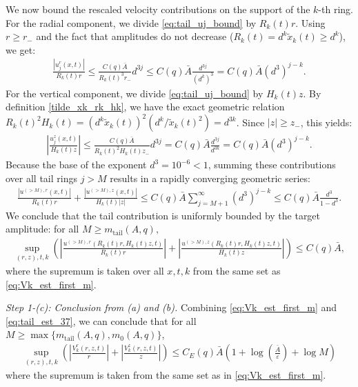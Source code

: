 \documentclass[reqno,11pt]{amsart}
\begin{document}
We now bound the rescaled velocity contributions on the support of the $k$-th ring. For the radial component, we divide \eqref{eq:tail_uj_bound} by $R_k(t) r$. Using $r \ge r_-$ and the fact that amplitudes do not decrease ($R_k(t) = d^k \tilde{x}_k(t) \ge d^k$), we get:
\begin{align*}
    \frac{|u_j^r(x,t)|}{R_k(t) r} 
    \le \frac{C(q) \bar A}{R_k(t)^3 r_-} d^{3j} 
    \le C(q) \bar A \frac{d^{3j}}{(d^k)^3} 
    = C(q) \bar A (d^3)^{j-k}.
\end{align*}
For the vertical component, we divide \eqref{eq:tail_uj_bound} by $H_k(t) z$. By definition \eqref{tilde_xk_rk_hk}, we have the exact geometric relation $R_k(t)^2 H_k(t) = (d^k \tilde{x}_k(t))^2 (d^k / \tilde{x}_k(t)^2) = d^{3k}$. Since $|z| \ge z_-$, this yields:
\begin{align*}
    \left| \frac{u_j^z(x,t)}{H_k(t) z} \right|
    \le \frac{C(q) \bar A}{R_k(t)^2 H_k(t) z_-} d^{3j} 
    = C(q) \bar A \frac{d^{3j}}{d^{3k}} 
    = C(q) \bar A (d^3)^{j-k}.
\end{align*}
Because the base of the exponent $d^3 = 10^{-6} < 1$, summing these contributions over all tail rings $j > M$ results in a rapidly converging geometric series:
\begin{align*}
    \frac{|u^{(>M),r}(x,t)|}{R_k(t) r} + \frac{|u^{(>M),z}(x,t)|}{H_k(t) |z|}
    \le C(q) \bar A \sum_{j=M+1}^\infty (d^3)^{j-k} 
    \le C(q) \bar A \frac{d^3}{1-d^3}.
\end{align*}
We conclude that the tail contribution is uniformly bounded by the target amplitude: for all  $M\geq m_{\mathrm{tail}}(A,q),$
\begin{align}
\label{eq:tail_est_37}
    \sup_{(r,z),t,k} \left( \left| \frac{u^{(>M),r}(R_k(t) r, H_k(t) z, t)}{R_k(t) r} \right| + \left| \frac{u^{(>M),z}(R_k(t) r, H_k(t) z, t)}{H_k(t) z} \right| \right) \le C(q) \bar A,
\end{align}
where the supremum is taken over all $x,t,k$ from the same set as \eqref{eq:Vk_est_first_m}.

\medskip
 \noindent \emph{Step 1-(c): Conclusion from (a) and (b).}
Combining \eqref{eq:Vk_est_first_m} and \eqref{eq:tail_est_37}, we can conclude that
for all $M\geq \max\{{m_{\mathrm{tail}}(A,q),m_0(A,q)}\}$,
\begin{align*}
\sup_{(r,z),t,k} 
\left(
\left|\frac{V_k^r(r,z,t)}{r}\right|
+\left|\frac{V_k^z(r,z,t)}{z}\right|
\right) \leq C_E(q) \bar A 
\left(
1+\log \left( \frac{\bar A}{\varepsilon} \right) 
+ \log M
\right)
\end{align*}
where the supremum is taken from the same set as in \eqref{eq:Vk_est_first_m}.
\end{document}
